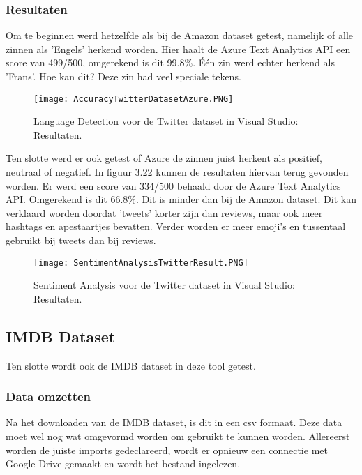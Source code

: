 \subsubsection{Resultaten}
\label{twitterdatasetresultatenazure}
Om te beginnen werd hetzelfde als bij de Amazon dataset getest, namelijk of alle zinnen als 'Engels' herkend worden. 
Hier haalt de Azure Text Analytics API een score van 499/500, omgerekend is dit 99.8\%. Één zin werd echter herkend als 'Frans'. Hoe kan dit? Deze zin had veel speciale tekens. 

\begin{figure}[!htbp]
    \texttt{[image: AccuracyTwitterDatasetAzure.PNG]}
    \caption{\label{azurelanguagedetectiontwitterresults}Language Detection voor de Twitter dataset in Visual Studio: Resultaten.}
\end{figure}
\FloatBarrier 

Ten slotte werd er ook getest of Azure de zinnen juist herkent als positief, neutraal of negatief. In figuur 3.22 kunnen de resultaten hiervan terug gevonden worden. Er werd een score van 334/500 behaald door de Azure Text Analytics API. Omgerekend is dit 66.8\%. Dit is minder dan bij de Amazon dataset. Dit kan verklaard worden doordat 'tweets' korter zijn dan reviews, maar ook meer hashtags en apestaartjes bevatten. Verder worden er meer emoji's en tussentaal gebruikt bij tweets dan bij reviews.

\begin{figure}[!htbp]
    \texttt{[image: SentimentAnalysisTwitterResult.PNG]}
    \caption{\label{azuresentimentanalysistwitterresults}Sentiment Analysis voor de Twitter dataset in Visual Studio: Resultaten.}
\end{figure}
\FloatBarrier 

\subsection{IMDB Dataset}
\label{imdbdatasetazure}
Ten slotte wordt ook de IMDB dataset in deze tool getest. 

\subsubsection{Data omzetten}
\label{imdbdatasetomzettenazure}
Na het downloaden van de IMDB dataset, is dit in een csv formaat. Deze data moet wel nog wat omgevormd worden om gebruikt te kunnen worden. Allereerst worden de juiste imports gedeclareerd, wordt er opnieuw een connectie met Google Drive gemaakt en wordt het bestand ingelezen. 

